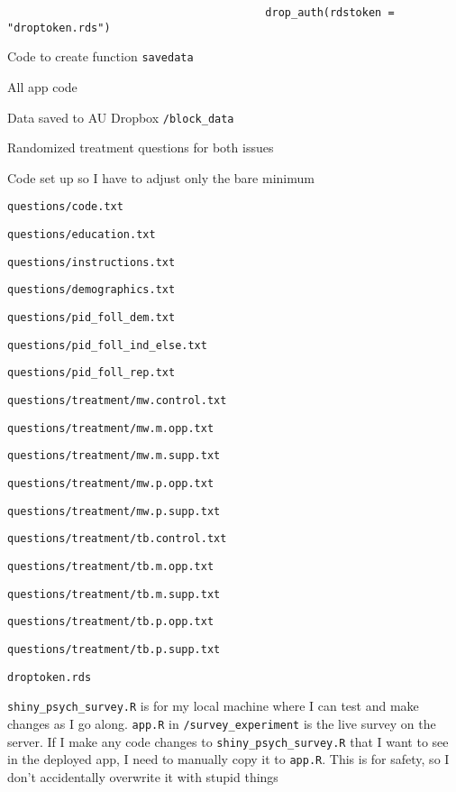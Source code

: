 \begin{coi}
\begin{coi}
\begin{coi}
\begin{coi}
									\begin{verbatim}
										drop_auth(rdstoken = "droptoken.rds")
									\end{verbatim}
								\item Code to create function {\tt savedata}
								\item All app code
								\item Data saved to AU Dropbox {\tt /block\_data}
								\item Randomized treatment questions for both issues
								\item Code set up so I have to adjust only the bare minimum
							\end{coi}
						\item {\tt questions/code.txt}
						\item {\tt questions/education.txt}
						\item {\tt questions/instructions.txt}
						\item {\tt questions/demographics.txt}
						\item \texttt{questions/pid\_foll\_dem.txt}
						\item \texttt{questions/pid\_foll\_ind\_else.txt}
						\item \texttt{questions/pid\_foll\_rep.txt}
						\item {\tt questions/treatment/mw.control.txt}
						\item {\tt questions/treatment/mw.m.opp.txt}
						\item {\tt questions/treatment/mw.m.supp.txt}
						\item {\tt questions/treatment/mw.p.opp.txt}
						\item {\tt questions/treatment/mw.p.supp.txt}
						\item {\tt questions/treatment/tb.control.txt}
						\item {\tt questions/treatment/tb.m.opp.txt}
						\item {\tt questions/treatment/tb.m.supp.txt}
						\item {\tt questions/treatment/tb.p.opp.txt}
						\item {\tt questions/treatment/tb.p.supp.txt}
						\item {\tt droptoken.rds}
					\end{coi}
			\end{coi}
		\item {\tt shiny\_psych\_survey.R} is for my local machine where I can test and make changes as I go along. {\tt app.R} in {\tt /survey\_experiment} is the live survey on the server. If I make any code changes to {\tt shiny\_psych\_survey.R} that I want to see in the deployed app, I need to manually copy it to {\tt app.R}. This is for safety, so I don't accidentally overwrite it with stupid things

\end{coi}
